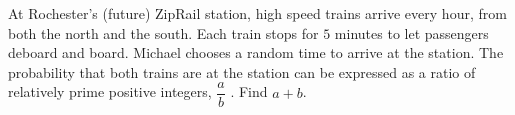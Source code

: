 At Rochester's (future) ZipRail station, high speed trains arrive every hour, from both the north and the south. Each train stops for $5$ minutes to let passengers deboard and board. Michael chooses a random time to arrive at the station. The probability that both trains are at the station can be expressed as a ratio of relatively prime positive integers,  $\dfrac{a}{b}$ . Find $a + b$.
